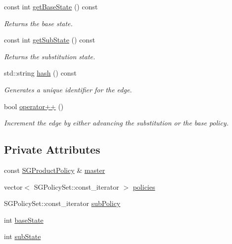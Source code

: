 \begin{DoxyCompactItemize}
\mbox{\label{classSGEdgePolicy_a9ba9e008e8f581ed48b700ab51cc237a}} 
const int \hyperlink{classSGEdgePolicy_a9ba9e008e8f581ed48b700ab51cc237a}{get\+Base\+State} () const
\begin{DoxyCompactList}\small\item\em Returns the base state. \end{DoxyCompactList}\item 
\mbox{\label{classSGEdgePolicy_a3e4ee651697b056738b6c8675b0c066d}} 
const int \hyperlink{classSGEdgePolicy_a3e4ee651697b056738b6c8675b0c066d}{get\+Sub\+State} () const
\begin{DoxyCompactList}\small\item\em Returns the substitution state. \end{DoxyCompactList}\item 
std\+::string \hyperlink{classSGEdgePolicy_ae106e1a7ebf78b0896316e16ca9c6063}{hash} () const
\begin{DoxyCompactList}\small\item\em Generates a unique identifier for the edge. \end{DoxyCompactList}\item 
\mbox{\label{classSGEdgePolicy_a508ce3538972a16ecbaaff0362b785e2}} 
bool \hyperlink{classSGEdgePolicy_a508ce3538972a16ecbaaff0362b785e2}{operator++} ()
\begin{DoxyCompactList}\small\item\em Increment the edge by either advancing the substitution or the base policy. \end{DoxyCompactList}\end{DoxyCompactItemize}
\subsection*{Private Attributes}
\begin{DoxyCompactItemize}
\item 
const \hyperlink{classSGProductPolicy}{S\+G\+Product\+Policy} \& \hyperlink{classSGEdgePolicy_a78e0d811ff7c8847af1f84de160f8ec9}{master}
\item 
vector$<$ S\+G\+Policy\+Set\+::const\+\_\+iterator $>$ \hyperlink{classSGEdgePolicy_a4e18fb2c342c4349a89a2a47b5dc9f18}{policies}
\item 
S\+G\+Policy\+Set\+::const\+\_\+iterator \hyperlink{classSGEdgePolicy_a2b008e2ce91f6c95130af3efc5915e7f}{sub\+Policy}
\item 
int \hyperlink{classSGEdgePolicy_a28dccfb7e5195256e2ca6ababb03b45f}{base\+State}
\item 
int \hyperlink{classSGEdgePolicy_af12e8542627470a6c50abc6925512737}{sub\+State}
\end{DoxyCompactItemize}


